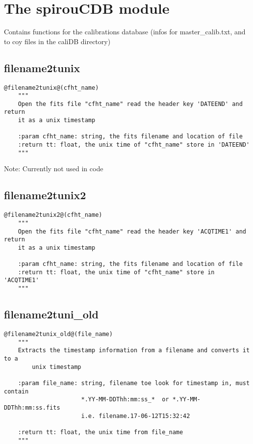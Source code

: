 \clearpage
\newpage
\section{The spirouCDB module}

Contains functions for the calibrations database (infos for master\_calib.txt, and to coy files in the caliDB directory)

\subsection{filename2tunix}
\begin{lstlisting}[style=pythonstyle]
@filename2tunix@(cfht_name)
    """
    Open the fits file "cfht_name" read the header key 'DATEEND' and return
    it as a unix timestamp
    
    :param cfht_name: string, the fits filename and location of file
    :return tt: float, the unix time of "cfht_name" store in 'DATEEND' 
    """
\end{lstlisting}

\noindent Note: Currently not used in code \\

\subsection{filename2tunix2}
\begin{lstlisting}[style=pythonstyle]
@filename2tunix2@(cfht_name)
    """
    Open the fits file "cfht_name" read the header key 'ACQTIME1' and return
    it as a unix timestamp

    :param cfht_name: string, the fits filename and location of file
    :return tt: float, the unix time of "cfht_name" store in 'ACQTIME1'
    """
\end{lstlisting}

\subsection{filename2tuni\_old}
\begin{lstlisting}[style=pythonstyle]
@filename2tunix_old@(file_name)
    """
    Extracts the timestamp information from a filename and converts it to a 
        unix timestamp

    :param file_name: string, filename toe look for timestamp in, must contain
                      *.YY-MM-DDThh:mm:ss_*  or *.YY-MM-DDThh:mm:ss.fits
                      i.e. filename.17-06-12T15:32:42
                      
    :return tt: float, the unix time from file_name
    """
\end{lstlisting}

